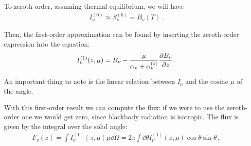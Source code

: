 \documentclass[main.tex]{subfiles}
\begin{document}
To zeroth order, assuming thermal equilibrium, we will have 
%
\begin{align}
I_\nu^{(0)} \approx S_\nu^{(0)} = B_\nu (T)
\,.
\end{align}

Then, the first-order approximation can be found by inserting the zeroth-order expression into the equation: 
%
\begin{align}
I_{\nu }^{(1)} (z, \mu ) = B_\nu - \frac{\mu }{\alpha_{\nu } + \alpha_{\nu }^{(s)}} \pdv{B_\nu }{z} 
\,.
\end{align}

An important thing to note is the linear relation between \(I_\nu \) and the cosine \(\mu \) of the angle. 

With this first-order result we can compute the flux: if we were to use the zeroth-order one we would get zero, since blackbody radiation is isotropic. 
The flux is given by the integral over the solid angle: 
%
\begin{align}
F_{\nu }(z) = \int I_\nu^{(1)} (z, \mu ) \mu \dd{\Omega }
= 2 \pi \int \dd{\theta } I_\nu^{(1)} (z, \mu ) \cos \theta \sin \theta 
\,,
\end{align}
%
\end{document}
